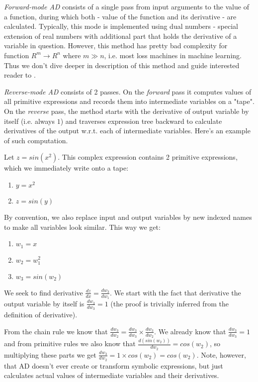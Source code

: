 \documentclass[conference]{IEEEtran}
\begin{document}
\textit{Forward-mode AD} consists of a single pass from input arguments to the value of a function, during which both - value of the function and its derivative - are calculated. Typically, this mode is implemented using dual numbers - special extension of real numbers with additional part that holds the derivative of a variable in question. However, this method has pretty bad complexity for function $R^m \to R^n$ where $m \gg n$, i.e. most loss machines in machine learning. Thus we don't dive deeper in description of this method and guide interested reader to \cite{stan}.

\textit{Reverse-mode AD} consists of 2 passes. On the \textit{forward} pass it computes values of all primitive expressions and records them into intermediate variables on a "tape". On the \textit{reverse} pass, the method starts with the derivative of output variable by itself (i.e. always $1$) and traverses expression tree backward to calculate derivatives of the output w.r.t. each of intermediate variables. Here's an example of such computation. 

Let $z = sin(x^2)$. This complex expression contains 2 primitive expressions, which we immediately write onto a tape:

\begin{enumerate}
\item $y = x^2$
\item $z = sin(y)$
\end{enumerate}

By convention, we also replace input and output variables by new indexed names to make all variables look similar. This way we get:

\begin{enumerate}
\item $w_1 = x$
\item $w_2 = w_1^2$
\item $w_3 = sin(w_2)$
\end{enumerate}

We seek to find derivative $\frac{dz}{dx} = \frac{dw_3}{dw_1}$. We start with the fact that derivative the output variable by itself is $\frac{dw_3}{dw_3} = 1$ (the proof is trivially inferred from the definition of derivative). 

From the chain rule we know that $\frac{dw_3}{dw_2} = \frac{dw_3}{dw_3} \times \frac{dw_3}{dw_2}$. We already know that $\frac{dw_3}{dw_3} = 1$ and from primitive rules we also know that $\frac{d(sin(w_2))}{dw_2} = cos(w_2)$, so multiplying these parts we get $\frac{dw_3}{dw_2} = 1 \times cos(w_2) = cos(w_2)$. Note, however, that AD doesn't ever create or transform symbolic expressions, but just calculates actual values of intermediate variables and their derivatives. 
\end{document}
